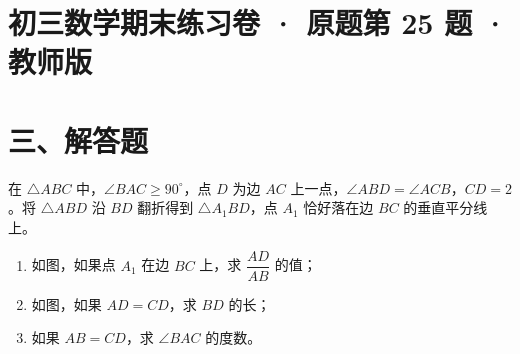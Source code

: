 \documentclass{exam-zh}
\begin{document}
\section*{初三数学期末练习卷 · 原题第 25 题 · 教师版}

\section*{三、解答题}


\begin{problem}[points=14]
  \noindent
  \begin{minipage}[t]{\dimexpr\linewidth-66mm-6mm\relax}
    \vspace{0pt}
    在 $\triangle ABC$ 中，$\angle BAC\ge90^\circ$，点 $D$ 为边 $AC$ 上一点，$\angle ABD=\angle ACB$，$CD=2$。将 $\triangle ABD$ 沿 $BD$ 翻折得到 $\triangle A_1BD$，点 $A_1$ 恰好落在边 $BC$ 的垂直平分线上。
\begin{enumerate}
\item 如图，如果点 $A_1$ 在边 $BC$ 上，求 $\dfrac{AD}{AB}$ 的值；
\item 如图，如果 $AD=CD$，求 $BD$ 的长；
\item 如果 $AB=CD$，求 $\angle BAC$ 的度数。
\end{enumerate}
    

\end{minipage}
\end{problem}
\end{document}
